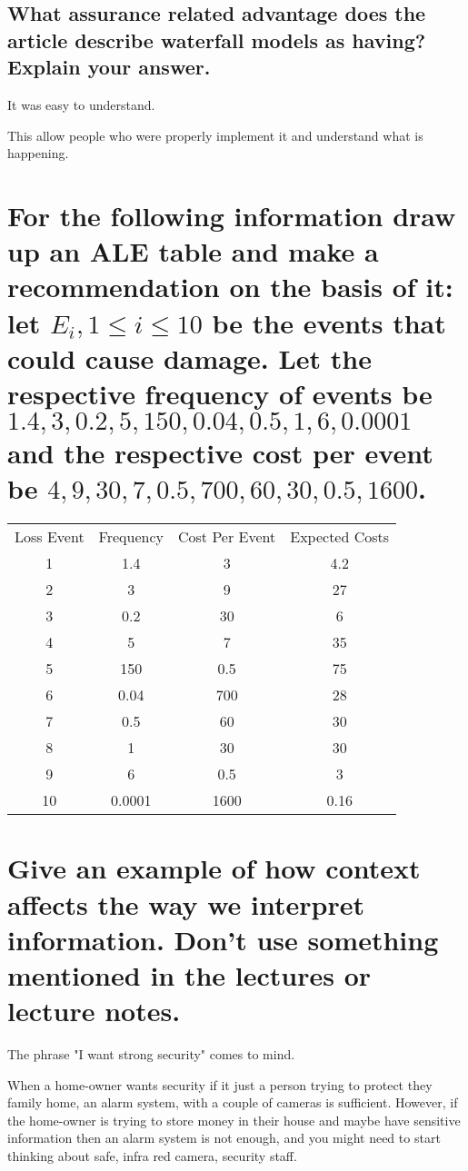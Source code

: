\documentclass{article}
\begin{document}
\subsection[Advantage]{What assurance related advantage does the article describe waterfall models as having? Explain your answer.}
It was easy to understand. 

This allow people who were properly implement it and understand what is happening. 

\section[ALE Table]{For the following information draw up an ALE table and make a recommendation on the basis of it: let $E_{i}, 1 \le i \le 10$ be the events that could cause damage. Let the respective frequency of events be ${1.4, 3, 0.2, 5, 150, 0.04, 0.5, 1, 6, 0.0001}$ and the respective cost per event be ${4, 9, 30, 7, 0.5, 700, 60, 30, 0.5, 1600}$.}


\begin{tabular}{c|c|c|c}
\hline
Loss Event & Frequency & Cost Per Event & Expected Costs \\
1 & 1.4 & 3 & 4.2\\
2 & 3 & 9 & 27\\
3 & 0.2 & 30 & 6 \\
4 & 5 & 7 & 35\\
5 & 150 & 0.5 & 75\\
6 & 0.04 & 700 & 28\\
7 & 0.5 & 60 & 30\\
8 & 1 & 30 & 30\\
9 & 6 & 0.5 & 3\\
10 & 0.0001 & 1600 & 0.16\\
\end{tabular}


\section[Context and Information]{Give an example of how context affects the way we interpret information. Don’t use something
mentioned in the lectures or lecture notes.}

The phrase "I want strong security" comes to mind.

When a home-owner wants security if it just a person trying to protect they family home, an alarm system, with a couple of cameras is sufficient. However, if the home-owner is trying to store money in their house and maybe have sensitive information then an alarm system is not enough, and you might need to start thinking about safe, infra red camera, security staff. 
\end{document}
